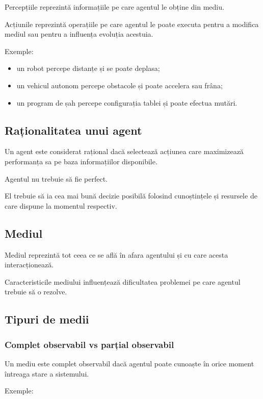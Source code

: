 \documentclass[12pt,a4paper]{article}
\begin{document}
Percepțiile reprezintă informațiile pe care agentul le obține din mediu.

Acțiunile reprezintă operațiile pe care agentul le poate executa pentru a modifica mediul sau pentru a influența evoluția acestuia.

Exemple:

\begin{itemize}
\item un robot percepe distanțe și se poate deplasa;
\item un vehicul autonom percepe obstacole și poate accelera sau frâna;
\item un program de șah percepe configurația tablei și poate efectua mutări.
\end{itemize}

\subsection{Raționalitatea unui agent}

Un agent este considerat rațional dacă selectează acțiunea care maximizează performanța sa pe baza informațiilor disponibile.

Agentul nu trebuie să fie perfect.

El trebuie să ia cea mai bună decizie posibilă folosind cunoștințele și resursele de care dispune la momentul respectiv.

\subsection{Mediul}

Mediul reprezintă tot ceea ce se află în afara agentului și cu care acesta interacționează.

Caracteristicile mediului influențează dificultatea problemei pe care agentul trebuie să o rezolve.

\subsection{Tipuri de medii}

\subsubsection{Complet observabil vs parțial observabil}

Un mediu este complet observabil dacă agentul poate cunoaște în orice moment întreaga stare a sistemului.

Exemple:
\end{document}
